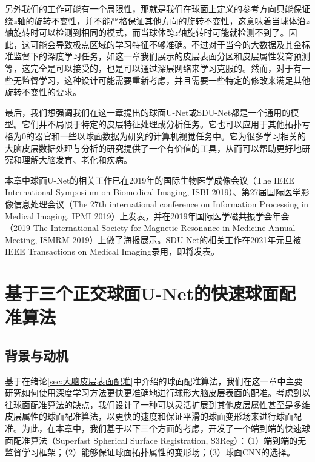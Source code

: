 另外我们的工作可能有一个局限性，那就是我们在球面上定义的参考方向只能保证绕$z$轴的旋转不变性，并不能严格保证其他方向的旋转不变性，这意味着当球体沿$z$轴旋转时可以检测到相同的模式，而当球体跨$z$轴旋转时可能就检测不到了。因此，这可能会导致极点区域的学习特征不够准确。不过对于当今的大数据及其金标准监督下的深度学习任务，如这一章我们展示的皮层表面分区和皮层属性发育预测等，这完全是可以接受的，也是可以通过深层网络来学习克服的。然而，对于有一些无监督学习，这种设计可能需要重新考虑，并且需要一些特定的修改来满足其他旋转不变性的要求。

最后，我们想强调我们在这一章提出的球面U-Net或SDU-Net都是一个通用的模型。它们并不局限于特定的皮层特征处理或分析任务。它也可以应用于其他拓扑亏格为0的器官和一些以球面数据为研究的计算机视觉任务中。它为很多学习相关的大脑皮层数据处理与分析的研究提供了一个有价值的工具，从而可以帮助更好地研究和理解大脑发育、老化和疾病。

本章中球面U-Net的相关工作已在2019年的国际生物医学成像会议（The IEEE International Symposium on Biomedical Imaging, ISBI 2019）、第27届国际医学影像信息处理会议（The 27th international conference on Information Processing in Medical Imaging, IPMI 2019）上发表，并在2019年国际医学磁共振学会年会（2019 The International Society for Magnetic Resonance in Medicine Annual Meeting, ISMRM 2019）上做了海报展示。SDU-Net的相关工作在2021年元旦被IEEE Transactions on Medical Imaging录用，即将发表。








\chapter{基于三个正交球面U-Net的快速球面配准算法}\label{sec:基于三个正交球面U-Net的快速球面配准算法}

\section{背景与动机}
基于在绪论\ref{sec:大脑皮层表面配准}中介绍的球面配准算法，我们在这一章中主要研究如何使用深度学习方法更快更准确地进行球形大脑皮层表面的配准。考虑到以往球面配准算法的缺点，我们设计了一种可以灵活扩展到其他皮层属性甚至是多维皮层属性的球面配准算法，以更快的速度和保证平滑的球面变形场来进行球面配准。为此，在本章中，我们基于以下三个方面的考虑，开发了一个端到端的快速球面配准算法（Superfast Spherical Surface Registration, S3Reg）：（1）端到端的无监督学习框架；（2）能够保证球面拓扑属性的变形场；（3）球面CNN的选择。

